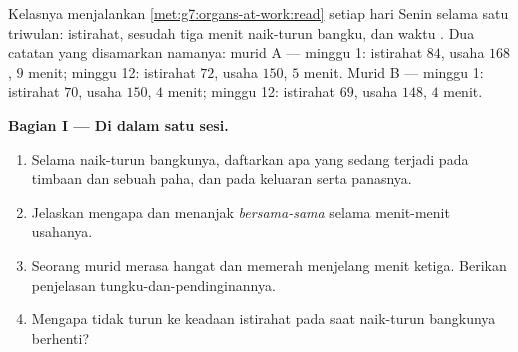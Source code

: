 \begin{problem}\label{pb:g7:organs-at-work:1}
Kelasnya menjalankan \cref{met:g7:organs-at-work:read} setiap hari
Senin selama satu triwulan:  istirahat,  sesudah
tiga menit naik-turun bangku, dan waktu . Dua catatan yang
disamarkan namanya: murid A --- minggu 1: istirahat $84$, usaha $168$,
 $9$ menit; minggu 12: istirahat $72$, usaha $150$, 
$5$ menit. Murid B --- minggu 1: istirahat $70$, usaha $150$,
 $4$ menit; minggu 12: istirahat $69$, usaha $148$, 
$4$ menit.

\medskip\noindent\textbf{Bagian I --- Di dalam satu sesi.}
\begin{enumerate}
  \item Selama naik-turun bangkunya, daftarkan apa yang sedang terjadi
        pada timbaan  dan  sebuah  paha, dan pada
        keluaran  serta panasnya.
  \item Jelaskan mengapa  dan  menanjak
        \emph{bersama-sama} selama menit-menit usahanya.
  \item Seorang murid merasa hangat dan memerah menjelang menit
        ketiga. Berikan penjelasan tungku-dan-pendinginannya.
  \item Mengapa  tidak turun ke keadaan istirahat pada
        saat naik-turun bangkunya berhenti?
\end{enumerate}


\end{problem}
